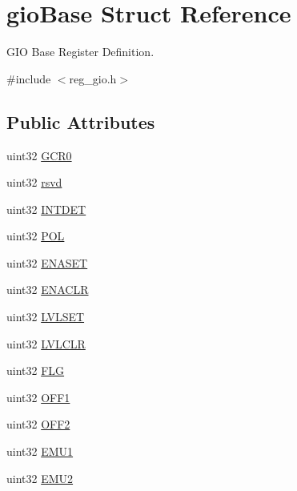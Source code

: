 \hypertarget{structgioBase}{}\section{gio\+Base Struct Reference}
\label{structgioBase}


G\+IO Base Register Definition.  




{\ttfamily \#include $<$reg\+\_\+gio.\+h$>$}

\subsection*{Public Attributes}
\begin{DoxyCompactItemize}
\item 
uint32 \mbox{\hyperlink{structgioBase_aaba8cfd4fd45b38729fc0eb9c594c481}{G\+C\+R0}}
\item 
uint32 \mbox{\hyperlink{structgioBase_a9c230d342103baff11e8098e61649191}{rsvd}}
\item 
uint32 \mbox{\hyperlink{structgioBase_a972632ec99052df535f1a88cbc7a88c6}{I\+N\+T\+D\+ET}}
\item 
uint32 \mbox{\hyperlink{structgioBase_a50608ea9dd682b4469235370ec534efc}{P\+OL}}
\item 
uint32 \mbox{\hyperlink{structgioBase_a51bcd1e7d79ecb2020513014b73cd9d2}{E\+N\+A\+S\+ET}}
\item 
uint32 \mbox{\hyperlink{structgioBase_aa79d76885b40a0848fbdb73b38f92449}{E\+N\+A\+C\+LR}}
\item 
uint32 \mbox{\hyperlink{structgioBase_a2de2bac0e893f429a1759f353a94ea31}{L\+V\+L\+S\+ET}}
\item 
uint32 \mbox{\hyperlink{structgioBase_afe5f6f4391825df2c539c9acfe9bbfd8}{L\+V\+L\+C\+LR}}
\item 
uint32 \mbox{\hyperlink{structgioBase_a2110fd9de00d8a94ed80324e200994f7}{F\+LG}}
\item 
uint32 \mbox{\hyperlink{structgioBase_a30acfa6dfeabc36a749a41f7143ba6ce}{O\+F\+F1}}
\item 
uint32 \mbox{\hyperlink{structgioBase_a9a26c57caea956a4c9bf1d0a3977c535}{O\+F\+F2}}
\item 
uint32 \mbox{\hyperlink{structgioBase_a24df703ab1ed74c4c1f258c656ada852}{E\+M\+U1}}
\item 
uint32 \mbox{\hyperlink{structgioBase_ae95d7cff6fa91bb969d7c249e4e7651e}{E\+M\+U2}}
\end{DoxyCompactItemize}


